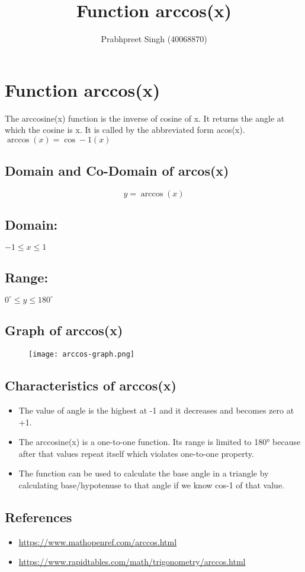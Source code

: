 \documentclass[12pt]{report}
\begin{document}
	\title{Function arccos(x)}
	\author{Prabhpreet Singh (40068870)}
	
	\maketitle
	\section*{Function arccos(x)}
	
	The arccosine(x) function is the inverse of cosine of x. It returns the angle at which the cosine is x. It is called by the abbreviated form acos(x). $\arccos(x) = \cos-1(x)$
	\subsection*{Domain and Co-Domain of arcos(x)}
	\begin{equation}
		y = \arccos(x)
	\end{equation}
	\subsection*{Domain:}
	$-1\leq x \leq1$
	
	\subsection*{Range:} 
	$0^\circ \leq y \leq 180^\circ$
	\subsection*{Graph of arccos(x)}
	\begin{figure}[H]
		\centering
		\texttt{[image: arccos-graph.png]}
		\label{Graph of arccos(x)}
	\end{figure}
	\subsection*{Characteristics of arccos(x)}
	\begin{itemize}
		\item The value of angle is the highest at -1 and it decreases and becomes zero at +1.
		\item The arccosine(x) is a one-to-one function. Its range is limited to 180° because after that values repeat itself which violates one-to-one property.
		\item The function can be used to calculate the base angle in a triangle by calculating base/hypotenuse to that angle if we know cos-1 of that value.
	\end{itemize}
	\subsection*{References}
	\begin{itemize}
		\item \url{https://www.mathopenref.com/arccos.html}
		\item \url{https://www.rapidtables.com/math/trigonometry/arccos.html}
	\end{itemize}
\end{document}
